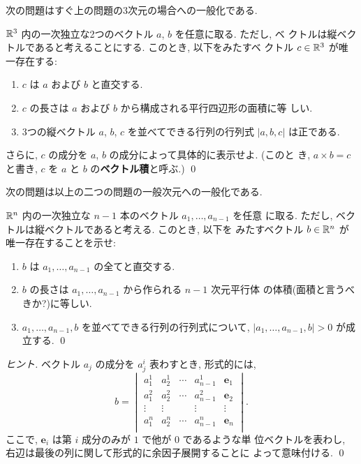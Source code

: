 \documentclass[12pt,twoside]{jarticle}
\newcommand\qstar[1]{}
\begin{document}
次の問題はすぐ上の問題の3次元の場合への一般化である.

\begin{question}[ベクトル積]\label{q:vector-prod}
  ${\mathbb R}^3$ 内の一次独立な2つのベクトル $a$, $b$ を任意に取る. ただし, ベ
  クトルは縦ベクトルであると考えることにする. このとき, 以下をみたすベ
  クトル $c \in {\mathbb R}^3$ が唯一存在する:
  \begin{enumerate}
  \item $c$ は $a$ および $b$ と直交する.
  \item $c$ の長さは $a$ および $b$ から構成される平行四辺形の面積に等
    しい.
  \item 3つの縦ベクトル $a$, $b$, $c$ を並べてできる行列の行列式 %
    $|a, b, c|$ は正である.
  \end{enumerate}
  さらに, $c$ の成分を $a$, $b$ の成分によって具体的に表示せよ. (このと
  き, $a \times b = c$ と書き, $c$ を $a$ と $b$ の{\bf ベクトル積}と呼ぶ.)
  \qed
\end{question}

次の問題は以上の二つの問題の一般次元への一般化である.

\begin{question}[ベクトル積の高次元への拡張]\qstar{*}
  ${\mathbb R}^n$ 内の一次独立な $n-1$ 本のベクトル $a_1,\dots,a_{n-1}$ を任意
  に取る. ただし, ベクトルは縦ベクトルであると考える. このとき, 以下を
  みたすベクトル $b \in {\mathbb R}^n$ が唯一存在することを示せ:
  \begin{enumerate}
  \item $b$ は $a_1,\dots,a_{n-1}$ の全てと直交する.
  \item $b$ の長さは $a_1,\dots,a_{n-1}$ から作られる $n-1$ 次元平行体
    の体積(面積と言うべきか?)に等しい.
  \item $a_1,\dots,a_{n-1}, b$ を並べてできる行列の行列式について,
    $|a_1,\ldots,a_{n-1}, b| > 0$ が成立する. \qed
  \end{enumerate}
\end{question}

\begin{proof}[ヒント]
 ベクトル $a_j$ の成分を $a_j^{i}$ 表わすとき, 形式的には, 
 \[
 b
 =
 \begin{vmatrix}
  a_1^1  & a_2^1  & \cdots & a_{n-1}^1 & \mathbf{e}_1 \\
  a_1^2  & a_2^2  & \cdots & a_{n-1}^2 & \mathbf{e}_2 \\
  \vdots & \vdots &        & \vdots    & \vdots     \\
  a_1^n  & a_2^n  & \cdots & a_{n-1}^n & \mathbf{e}_n \\
 \end{vmatrix}.
 \]
 ここで, $\mathbf{e}_i$ は第 $i$ 成分のみが $1$ で他が $0$ であるような単
 位ベクトルを表わし, 右辺は最後の列に関して形式的に余因子展開することに
 よって意味付ける.
 \qed
\end{proof}
\end{document}
